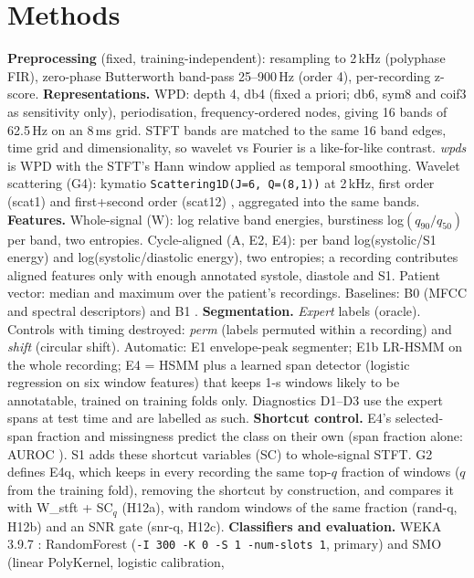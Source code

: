 \documentclass[conference]{IEEEtran}
\begin{document}
\section{Methods}
\textbf{Preprocessing} (fixed, training-independent): resampling to 2\,kHz (polyphase FIR), zero-phase Butterworth band-pass
25--900\,Hz (order 4), per-recording z-score.
\textbf{Representations.} WPD: depth 4, db4 (fixed a priori; db6, sym8 and coif3 as sensitivity only), periodisation,
frequency-ordered nodes, giving 16 bands of 62.5\,Hz on an 8\,ms grid. STFT bands are matched to the same 16 band edges,
time grid and dimensionality, so wavelet vs Fourier is a like-for-like contrast. \emph{wpds} is WPD with the STFT's Hann
window applied as temporal smoothing. Wavelet scattering (G4): kymatio \cite{andreux2020} \texttt{Scattering1D(J=6,
Q=(8,1))} at 2\,kHz, first order (scat1) and first+second order (scat12) \cite{anden2014}, aggregated into the same bands.
\textbf{Features.} Whole-signal (W): log relative band energies, burstiness log$(q_{90}/q_{50})$ per band, two entropies.
Cycle-aligned (A, E2, E4): per band log(systolic/S1 energy) and log(systolic/diastolic energy), two entropies; a recording
contributes aligned features only with enough annotated systole, diastole and S1. Patient vector: median and maximum over
the patient's recordings. Baselines: B0 (MFCC and spectral descriptors) and B1 \cite{vimalajeewa2025}.
\textbf{Segmentation.} \emph{Expert} labels (oracle). Controls with timing destroyed: \emph{perm} (labels permuted within a
recording) and \emph{shift} (circular shift). Automatic: E1 envelope-peak segmenter; E1b LR-HSMM \cite{springer2016} on the
whole recording; E4 = HSMM plus a learned span detector (logistic regression on six window features) that keeps 1-s windows
likely to be annotatable, trained on training folds only. Diagnostics D1--D3 use the expert spans at test time and are
labelled as such. \textbf{Shortcut control.} E4's selected-span fraction and missingness predict the class on their own
(span fraction alone: AUROC ). S1 adds these shortcut variables (SC) to whole-signal STFT. G2
defines E4q, which keeps in every recording the same top-$q$ fraction of windows ($q$ from the training fold), removing the
shortcut by construction, and compares it with W\_stft + SC$_q$ (H12a), with random windows of the same fraction (rand-q,
H12b) and an SNR gate (snr-q, H12c).
\textbf{Classifiers and evaluation.} WEKA 3.9.7 \cite{frank2016}: RandomForest \cite{breiman2001}
(\texttt{-I 300 -K 0 -S 1 -num-slots 1}, primary) and SMO \cite{platt1998} (linear PolyKernel, logistic calibration,
\end{document}
